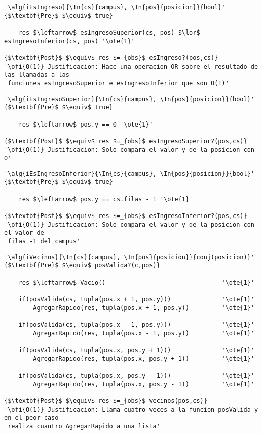\begin{lstlisting}[mathescape]
'\alg{iEsIngreso}{\In{cs}{campus}, \In{pos}{posicion}}{bool}'
{$\textbf{Pre}$ $\equiv$ true}

	res $\leftarrow$ esIngresoSuperior(cs, pos) $\lor$ esIngresoInferior(cs, pos) '\ote{1}'

{$\textbf{Post}$ $\equiv$ res $=_{obs}$ esIngreso?(pos,cs)}
'\ofi{O(1)} Justificacion: Hace una operacion OR sobre el resultado de las llamadas a las  
 funciones esIngresoSuperior e esIngresoInferior que son O(1)'
\end{lstlisting}

\begin{lstlisting}[mathescape]
'\alg{iEsIngresoSuperior}{\In{cs}{campus}, \In{pos}{posicion}}{bool}'
{$\textbf{Pre}$ $\equiv$ true}
	
	res $\leftarrow$ pos.y == 0 '\ote{1}'

{$\textbf{Post}$ $\equiv$ res $=_{obs}$ esIngresoSuperior?(pos,cs)}
'\ofi{O(1)} Justificacion: Solo compara el valor y de la posicion con 0'
\end{lstlisting}

\begin{lstlisting}[mathescape]
'\alg{iEsIngresoInferior}{\In{cs}{campus}, \In{pos}{posicion}}{bool}'
{$\textbf{Pre}$ $\equiv$ true}

	res $\leftarrow$ pos.y == cs.filas - 1 '\ote{1}'

{$\textbf{Post}$ $\equiv$ res $=_{obs}$ esIngresoInferior?(pos,cs)}
'\ofi{O(1)} Justificacion: Solo compara el valor y de la posicion con el valor de 
 filas -1 del campus'
\end{lstlisting}

\begin{lstlisting}[mathescape]
'\alg{iVecinos}{\In{cs}{campus}, \In{pos}{posicion}}{conj(posicion)}'
{$\textbf{Pre}$ $\equiv$ posValida?(c,pos)}

	res $\leftarrow$ Vacio() 								'\ote{1}'

	if(posValida(cs, tupla(pos.x + 1, pos.y))) 				'\ote{1}'
		AgregarRapido(res, tupla(pos.x + 1, pos.y))			'\ote{1}'	

	if(posValida(cs, tupla(pos.x - 1, pos.y))) 				'\ote{1}'
		AgregarRapido(res, tupla(pos.x - 1, pos.y))			'\ote{1}'	

	if(posValida(cs, tupla(pos.x, pos.y + 1))) 				'\ote{1}'
		AgregarRapido(res, tupla(pos.x, pos.y + 1))			'\ote{1}'

	if(posValida(cs, tupla(pos.x, pos.y - 1)))				'\ote{1}'
		AgregarRapido(res, tupla(pos.x, pos.y - 1))			'\ote{1}'

{$\textbf{Post}$ $\equiv$ res $=_{obs}$ vecinos(pos,cs)}
'\ofi{O(1)} Justificacion: Llama cuatro veces a la funcion posValida y en el peor caso 
 realiza cuantro AgregarRapido a una lista'
\end{lstlisting}

